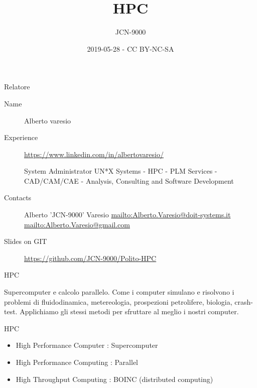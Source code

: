 \documentclass[ignorenonframetext,]{beamer}
\title{HPC}
\author{JCN-9000}
\date{2019-05-28 - CC BY-NC-SA}
\providecommand{\tightlist}{%
  \setlength{\itemsep}{0pt}\setlength{\parskip}{0pt}}
\begin{document}
\frame{\titlepage}

\begin{frame}{Relatore}

\begin{description}
\item[Name]
Alberto varesio
\item[Experience]
\url{https://www.linkedin.com/in/albertovaresio/}

System Administrator UN*X Systems - HPC - PLM Services - CAD/CAM/CAE -
Analysis, Consulting and Software Development
\item[Contacts]
Alberto 'JCN-9000' Varesio
\href{Alberto.Varesio@doit-systems.it}{mailto:Alberto.Varesio@doit-systems.it}
\href{Alberto.Varesio@gmail.com}{mailto:Alberto.Varesio@gmail.com}
\item[Slides on GIT]
\url{https://github.com/JCN-9000/Polito-HPC}
\end{description}


\end{frame}

\begin{frame}{HPC}

Supercomputer e calcolo parallelo. Come i computer simulano e risolvono
i problemi di fluidodinamica, metereologia, prospezioni petrolifere,
biologia, crash-test. Applichiamo gli stessi metodi per sfruttare al
meglio i nostri computer.

\end{frame}

\begin{frame}{HPC}

\begin{itemize}
\tightlist
\item
  High Performance Computer : Supercomputer
\item
  High Performance Computing : Parallel
\item
  High Throughput Computing : BOINC (distributed computing)
\end{itemize}


\end{frame}
\end{document}
